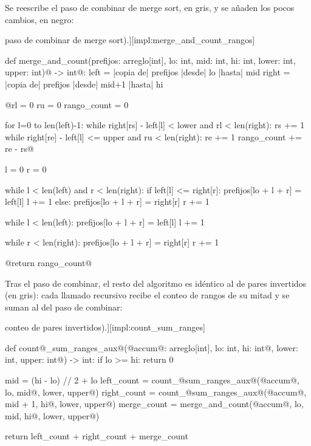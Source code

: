 Se reescribe el paso de combinar de merge sort, en gris, y se añaden los pocos cambios, en negro:
\begin{codeblock}[Combinar y contar sumas de rango (en gris: \hyperref[impl:merge]{paso de combinar de merge sort}).][impl:merge_and_count_rangos]
\begin{pseudocode}[style=derived]
def merge_and_count(prefijos: arreglo[int], lo: int, mid: int, hi: int, lower: int, upper: int)@ -> int@:
    left = |\textrm{copia de}| prefijos |\textrm{desde}| lo |\textrm{hasta}| mid
    right = |\textrm{copia de}| prefijos |\textrm{desde}| mid+1 |\textrm{hasta}| hi

    @rl = 0
    ru = 0
    rango_count = 0

    for l=0 to len(left)-1:
        while right[rs] - left[l] < lower and rl < len(right):
            rs += 1
        while right[re] - left[l] <= upper and ru < len(right):
            re += 1
        rango_count += re - rs@

    l = 0
    r = 0

    while l < len(left) and r < len(right):
        if left[l] <= right[r]:
            prefijos[lo + l + r] = left[l]
            l += 1
        else:
            prefijos[lo + l + r] = right[r]
            r += 1

    while l < len(left):
        prefijos[lo + l + r] = left[l]
        l += 1

    while r < len(right):
        prefijos[lo + l + r] = right[r]
        r += 1

    @return rango_count@
\end{pseudocode}
\end{codeblock}

Tras el paso de combinar, el resto del algoritmo es idéntico al de pares invertidos (en gris): cada llamado recursivo recibe el conteo de rangos de su mitad y se suman al del paso de combinar:
\begin{codeblock}[Conteo de sumas de rango (en gris: \hyperref[impl:count_inverted_pairs]{conteo de pares invertidos}).][impl:count_sum_ranges]
\begin{pseudocode}[style=derived]
def count@_sum_ranges_aux@(@accum@: arreglo[int], lo: int, hi: int@, lower: int, upper: int@) -> int:
    if lo >= hi: return 0

    mid = (hi - lo) // 2 + lo
      left_count = count_@sum_ranges_aux@(@accum@, lo, mid@, lower, upper@)
    right_count = count_@sum_ranges_aux@(@accum@, mid + 1, hi@, lower, upper@)
    merge_count = merge_and_count(@accum@, lo, mid, hi@, lower, upper@)

    return left_count + right_count + merge_count
\end{pseudocode}
\end{codeblock}



